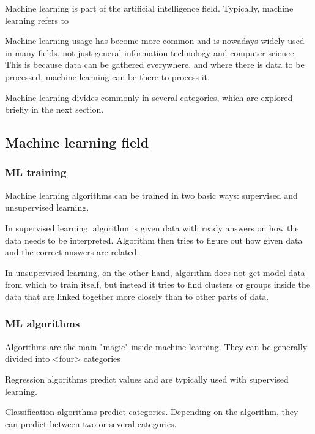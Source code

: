 \documentclass[english, 12pt, a4paper, elec, utf8, a-1b, online]{aaltothesis}
\begin{document}
Machine learning is part of the artificial intelligence field.
Typically, machine learning refers to %

Machine learning usage has become more common
and is nowadays widely used in many fields,
not just general information technology and computer science.
This is because data can be gathered everywhere,
and where there is data to be processed,
machine learning can be there to process it.

Machine learning divides commonly in several categories,
which are explored briefly in the next section.


\subsection*{Machine learning field}\label{subsec:bg-ml-field}

\subsubsection*{ML training}
Machine learning algorithms can be trained in two basic ways:
supervised and unsupervised learning.

In supervised learning,
algorithm is given data with ready answers on
how the data needs to be interpreted.
Algorithm then tries to figure out
how given data and the correct answers are related.

In unsupervised learning,
on the other hand,
algorithm does not get model data from which to train itself,
but instead it tries to find clusters or groups inside the data
that are linked together more closely than to other parts of data.

\subsubsection*{ML algorithms}
Algorithms are the main "magic" inside machine learning. %
They can be generally divided into <four> categories %

Regression algorithms predict values
and are typically used with supervised learning.

Classification algorithms predict categories.
Depending on the algorithm,
they can predict between two or several categories.
\end{document}

